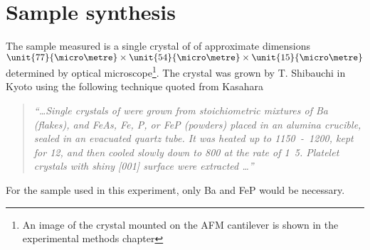 \section{Sample synthesis}

The sample measured is a single crystal of \BaFeP of approximate dimensions $\unit{77}{\micro\metre}\times\unit{54}{\micro\metre}\times \unit{15}{\micro\metre}$ determined by optical microscope\footnote{An image of the crystal mounted on the \ac{AFM} cantilever is shown in the experimental methods chapter}. The crystal was grown by T. Shibauchi in Kyoto using the following technique quoted from Kasahara \etal~\cite{Kasahara2010}

\begin{quote}
\textit{``\ldots Single crystals of \BaFePAs were grown from stoichiometric mixtures of Ba (flakes), and FeAs, Fe, P, or FeP (powders) placed in an alumina crucible, sealed in an evacuated quartz tube. It was heated up to \unit{1150-1200}{\celsius}, kept for \unit{12}{\hour}, and then cooled slowly down to \unit{800}{\celsius} at the rate of \unit{1.5}{\celsius\per\hour}. Platelet crystals with shiny [001] surface were extracted \ldots''}
\end{quote}

For the \BaFeP sample used in this experiment, only Ba and FeP would be necessary.

